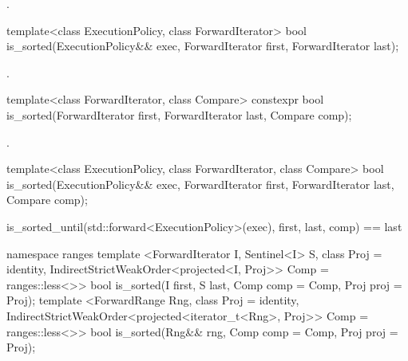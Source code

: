 \begin{itemdescr}
\pnum
\returns {}.
\end{itemdescr}

%
\begin{itemdecl}
template<class ExecutionPolicy, class ForwardIterator>
  bool is_sorted(ExecutionPolicy&& exec,
                 ForwardIterator first, ForwardIterator last);
\end{itemdecl}

\begin{itemdescr}
\pnum
\returns {}.
\end{itemdescr}

%
\begin{itemdecl}
template<class ForwardIterator, class Compare>
  constexpr bool is_sorted(ForwardIterator first, ForwardIterator last,
                           Compare comp);
\end{itemdecl}

\begin{itemdescr}
\pnum
\returns {}.
\end{itemdescr}


%
\begin{itemdecl}
template<class ExecutionPolicy, class ForwardIterator, class Compare>
  bool is_sorted(ExecutionPolicy&& exec,
                 ForwardIterator first, ForwardIterator last,
                 Compare comp);
\end{itemdecl}

\begin{itemdescr}
\pnum
\returns
\begin{codeblock}
is_sorted_until(std::forward<ExecutionPolicy>(exec), first, last, comp) == last
\end{codeblock}
\end{itemdescr}

\begin{addedblock}
%
\begin{itemdecl}
namespace ranges {
  template <ForwardIterator I, Sentinel<I> S, class Proj = identity,
            IndirectStrictWeakOrder<projected<I, Proj>> Comp = ranges::less<>>
    bool is_sorted(I first, S last, Comp comp = Comp{}, Proj proj = Proj{});
  template <ForwardRange Rng, class Proj = identity,
            IndirectStrictWeakOrder<projected<iterator_t<Rng>, Proj>> Comp = ranges::less<>>
    bool is_sorted(Rng&& rng, Comp comp = Comp{}, Proj proj = Proj{});
}
\end{itemdecl}

\begin{itemdescr}
\pnum
\returns {}
\end{itemdescr}
\end{addedblock}

